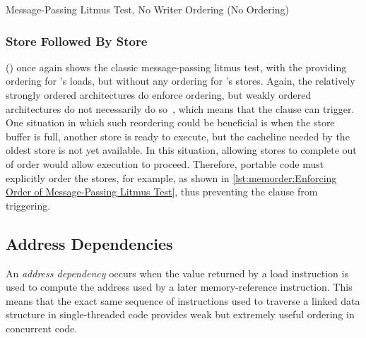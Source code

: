 \begin{listing}

\caption{Message-Passing Litmus Test, No Writer Ordering (No Ordering)}
\label{lst:memorder:Message-Passing Litmus Test; No Writer Ordering (No Ordering)}
\end{listing}

\subsubsection{Store Followed By Store}
\label{sec:memorder:Store Followed By Store}

()
once again shows the classic message-passing litmus test, with the
 providing ordering for 's loads, but without
any ordering for 's stores.
Again, the relatively strongly ordered architectures do enforce ordering,
but weakly ordered architectures do not necessarily do
so~\cite{JadeAlglave2011ppcmem}, which means that the
 clause can trigger.
One situation in which such reordering could be beneficial is when
the store buffer is full, another store is ready to execute, but the
cacheline needed by the oldest store is not yet available.
In this situation, allowing stores to complete out of order would
allow execution to proceed.
Therefore, portable code must explicitly order the stores, for
example, as shown in
\cref{lst:memorder:Enforcing Order of Message-Passing Litmus Test},
thus preventing the  clause from triggering.

\QuickQuizEnd

\subsection{Address Dependencies}
\label{sec:memorder:Address Dependencies}

An \emph{address dependency} occurs when the value returned by a load
instruction is used to compute the address used by a later memory-reference
instruction.
This means that the exact same sequence of instructions used to traverse
a linked data structure in single-threaded code provides weak but extremely
useful ordering in concurrent code.


